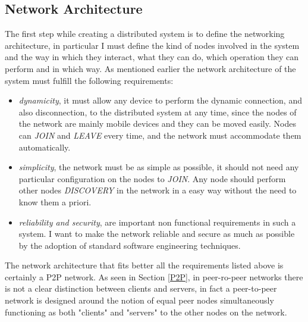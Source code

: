 \subsection{Network Architecture}
The first step while creating a distributed system is to define the networking architecture, in particular I must define the kind of nodes involved in the system and the way in which they interact, what they can do, which operation they can perform and in which way. As mentioned earlier the network architecture of the system must fulfill the following requirements:
\begin{itemize}
 \item \textit{dynamicity}, it must allow any device to perform the dynamic connection, and also disconnection, to the distributed system at any time, since the nodes of the network are mainly mobile devices and they can be moved easily. Nodes can \textit{JOIN} and \textit{LEAVE} every time, and the network must accommodate them automatically.
  \item \textit{simplicity}, the network must be as simple as possible, it should not need any particular configuration on the nodes to \textit{JOIN}. Any node should perform other nodes \textit{DISCOVERY} in the network in a easy way without the need to know them a priori.
 \item \textit{reliability and security}, are important non functional requirements in such a system. I want to make the network reliable and secure as much as possible by the adoption of standard software engineering techniques.
\end{itemize}
The network architecture that fits better all the requirements listed above is certainly a P2P network. As seen in Section \ref{P2P}, in peer-ro-peer networks there is not a clear distinction between clients and servers, in fact a peer-to-peer network is designed around the notion of equal peer nodes simultaneously functioning as both "clients" and "servers" to the other nodes on the network.

